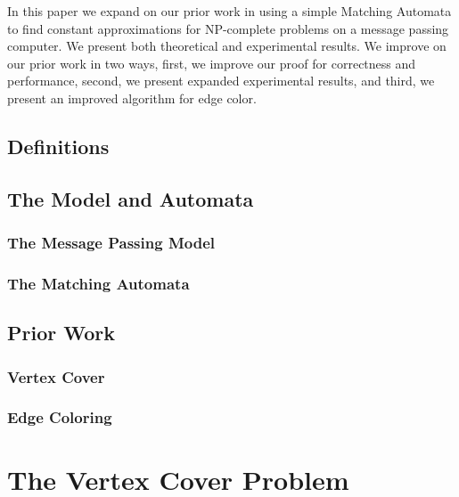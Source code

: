 \documentclass[twoside]{article}
\begin{document}
In this paper we expand on our prior work in \cite{Daigle:2011uq, Daigle:2012uq} using a simple Matching Automata to find constant approximations for NP-complete problems on a message passing computer. We present both theoretical and experimental results. We improve on our prior work in two ways, first, we improve our proof for correctness and performance, second, we present expanded experimental results, and third, we present an improved algorithm for edge color.


\subsection{Definitions}





\subsection{The Model and Automata}

\subsubsection{The Message Passing Model}

\subsubsection{The Matching Automata}


\subsection{Prior Work}

\subsubsection{Vertex Cover}



\subsubsection{Edge Coloring}



\section{The Vertex Cover Problem}
\end{document}
